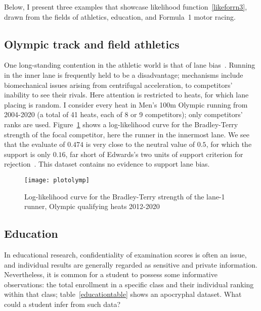 \documentclass[ejs,noshowframe]{imsart}
\theoremstyle{plain}
\theoremstyle{definition}
\theoremstyle{remark}
\begin{document}
Below, I present three examples that showcase likelihood
function~\ref{likeforrn3}, drawn from the fields of athletics,
education, and Formula~1 motor racing.

\subsection{Olympic track and field athletics}

One long-standing contention in the athletic world is that of lane
bias~\cite{munro2022}.  Running in the inner lane is frequently held
to be a disadvantage; mechanisms include biomechanical issues arising
from centrifugal acceleration, to competitors' inability to see their
rivals.  Here attention is restricted to heats, for which lane placing
is random.  I consider every heat in Men's 100m Olympic running from
2004-2020 (a total of 41 heats, each of 8 or 9 competitors); only
competitors' ranks are used.  Figure~\ref{plotolymp} shows a
log-likelihood curve for the Bradley-Terry strength of the focal
competitor, here the runner in the innermost lane.  We see that the
evaluate of $0.474$ is very close to the neutral value of $0.5$, for
which the support is only $0.16$, far short of Edwards's two units of
support criterion for rejection~\cite{edwards1972}.  This dataset
contains no evidence to support lane bias.

\begin{figure}[t]
\texttt{[image: plotolymp]} %
\caption{Log-likelihood curve for the Bradley-Terry strength of the
  lane-1 runner, Olympic qualifying heats 2012-2020 \label{plotolymp}}
\end{figure}

\subsection{Education}

In educational research, confidentiality of examination scores is
often an issue, and individual results are generally regarded as
sensitive and private information.  Nevertheless, it is common for a
student to possess some informative observations: the total enrollment
in a specific class and their individual ranking within that class;
table~\ref{educationtable} shows an apocryphal dataset.  What could a
student infer from such data?
\end{document}
